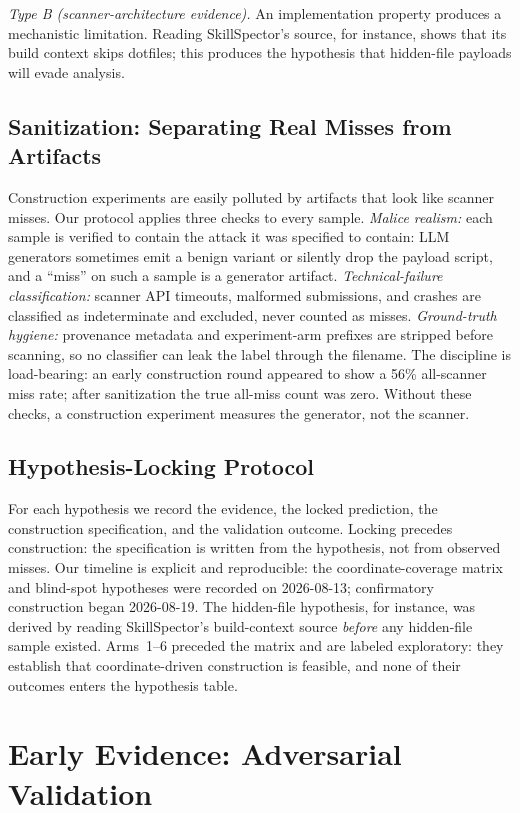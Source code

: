 \documentclass[sigconf,nonacm]{acmart}
\begin{document}
\emph{Type B (scanner-architecture evidence).} An implementation property produces a mechanistic limitation. Reading SkillSpector's source, for instance, shows that its build context skips dotfiles; this produces the hypothesis that hidden-file payloads will evade analysis.

\subsection{Sanitization: Separating Real Misses from Artifacts}
Construction experiments are easily polluted by artifacts that look like scanner misses. Our protocol applies three checks to every sample. \emph{Malice realism:} each sample is verified to contain the attack it was specified to contain: LLM generators sometimes emit a benign variant or silently drop the payload script, and a ``miss'' on such a sample is a generator artifact. \emph{Technical-failure classification:} scanner API timeouts, malformed submissions, and crashes are classified as indeterminate and excluded, never counted as misses. \emph{Ground-truth hygiene:} provenance metadata and experiment-arm prefixes are stripped before scanning, so no classifier can leak the label through the filename. The discipline is load-bearing: an early construction round appeared to show a 56\% all-scanner miss rate; after sanitization the true all-miss count was zero. Without these checks, a construction experiment measures the generator, not the scanner.

\subsection{Hypothesis-Locking Protocol}
For each hypothesis we record the evidence, the locked prediction, the construction specification, and the validation outcome. Locking precedes construction: the specification is written from the hypothesis, not from observed misses. Our timeline is explicit and reproducible: the coordinate-coverage matrix and blind-spot hypotheses were recorded on 2026-08-13; confirmatory construction began 2026-08-19. The hidden-file hypothesis, for instance, was derived by reading SkillSpector's build-context source \emph{before} any hidden-file sample existed. Arms~1--6 preceded the matrix and are labeled exploratory: they establish that coordinate-driven construction is feasible, and none of their outcomes enters the hypothesis table.

\section{Early Evidence: Adversarial Validation}
\label{sec:validate}
\end{document}
